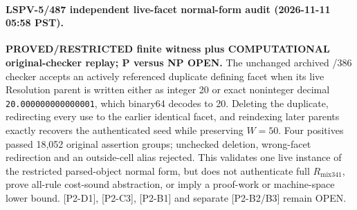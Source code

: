 \paragraph{LSPV-5/487 independent live-facet normal-form audit (2026-11-11 05:58 PST).}
\textbf{PROVED/RESTRICTED finite witness plus COMPUTATIONAL original-checker replay; P versus NP OPEN.}
The unchanged archived /386 checker accepts an actively referenced duplicate defining facet when its live Resolution parent is written either as integer 20 or exact noninteger decimal \texttt{20.000000000000001}, which binary64 decodes to 20.  Deleting the duplicate, redirecting every use to the earlier identical facet, and reindexing later parents exactly recovers the authenticated seed while preserving $W=50$.  Four positives passed 18,052 original assertion groups; unchecked deletion, wrong-facet redirection and an outside-cell alias rejected.  This validates one live instance of the restricted parsed-object normal form, but does not authenticate full $R_{\mathrm{mix341}}$, prove all-rule cost-sound abstraction, or imply a proof-work or machine-space lower bound.  [P2-D1], [P2-C3], [P2-B1] and separate [P2-B2/B3] remain OPEN.

